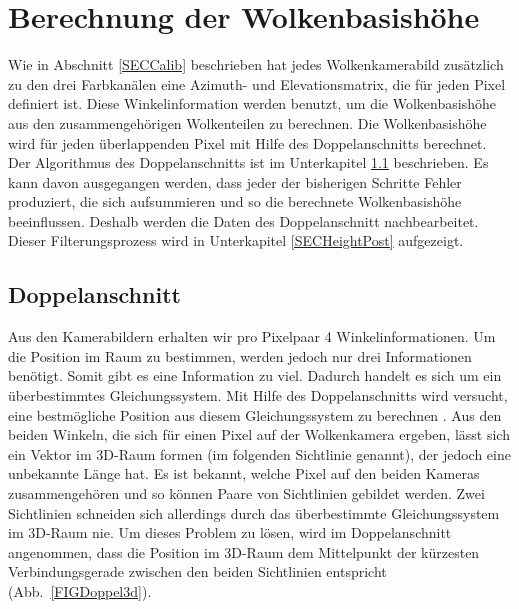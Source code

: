 \documentclass[a4paper,11pt,twoside,german]{article}
\newcommand{\absatz}{\smallbreak}
\begin{document}
\section{Berechnung der Wolkenbasishöhe}
\label{SECHoehenbestimmung}
Wie in Abschnitt \ref{SECCalib} beschrieben hat jedes Wolkenkamerabild
zusätzlich zu den drei Farbkanälen eine Azimuth- und Elevationsmatrix, die für
jeden Pixel definiert ist. Diese Winkelinformation werden benutzt, um die
Wolkenbasishöhe aus den zusammengehörigen Wolkenteilen zu berechnen. Die
Wolkenbasishöhe wird für jeden überlappenden Pixel mit Hilfe des
Doppelanschnitts berechnet. Der Algorithmus des Doppelanschnitts ist im
Unterkapitel \ref{SECDoppel} beschrieben. Es kann davon ausgegangen werden, dass
jeder der bisherigen Schritte Fehler produziert, die sich aufsummieren und so
die berechnete Wolkenbasishöhe beeinflussen. Deshalb werden die Daten des
Doppelanschnitt nachbearbeitet. Dieser Filterungsprozess wird in Unterkapitel
\ref{SECHeightPost} aufgezeigt.

\subsection{Doppelanschnitt}
\label{SECDoppel}
Aus den Kamerabildern erhalten wir pro Pixelpaar 4 Winkelinformationen. Um die
Position im Raum zu bestimmen, werden jedoch nur drei Informationen benötigt.
Somit gibt es eine Information zu viel. Dadurch handelt es sich um ein
überbestimmtes Gleichungssystem. Mit Hilfe des Doppelanschnitts wird versucht,
eine bestmögliche Position aus diesem Gleichungssystem zu berechnen
\citep{lange_16_praktikum}.
\absatz
Aus den beiden Winkeln, die sich für einen Pixel auf der Wolkenkamera ergeben,
lässt sich ein Vektor im 3D-Raum formen (im folgenden Sichtlinie genannt), der
jedoch eine unbekannte Länge hat. Es ist bekannt, welche Pixel auf den beiden
Kameras zusammengehören und so können Paare von Sichtlinien gebildet werden.
Zwei Sichtlinien schneiden sich allerdings durch das überbestimmte
Gleichungssystem im 3D-Raum nie. Um dieses Problem zu lösen, wird im
Doppelanschnitt angenommen, dass die Position im 3D-Raum dem Mittelpunkt der
kürzesten Verbindungsgerade zwischen den beiden Sichtlinien entspricht
(Abb.~\ref{FIGDoppel3d}).
\end{document}
